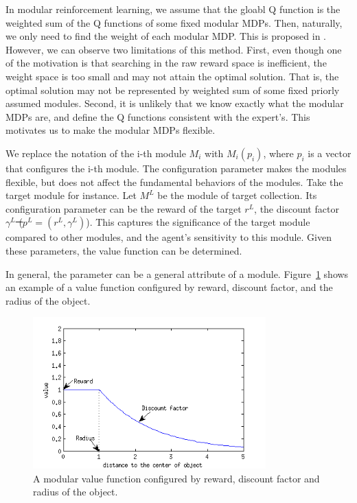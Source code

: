 \documentclass[12pt]{report}	%
\theoremstyle{definition}
\theoremstyle{remark}
\providecommand{\DIFadd}[1]{{\protect\color{blue}\uwave{#1}}} %
\providecommand{\DIFdel}[1]{{\protect\color{red}\sout{#1}}}                      %
\providecommand{\DIFaddbegin}{} %
\providecommand{\DIFaddend}{} %
\providecommand{\DIFdelbegin}{} %
\providecommand{\DIFdelend}{} %
\begin{document}
In modular reinforcement learning, we assume that the gloabl Q function is the
weighted sum of the Q functions of some fixed modular MDPs. Then, naturally, we only
need to find the weight of each modular MDP. This is proposed in \cite{rothkopf2013modular}.
However, we can observe two
limitations of this method. First, even though one of the motivation is that
searching in the raw reward space is inefficient, the weight space is too small and
may not attain the optimal solution. That is, the optimal solution may not be
represented by weighted sum of some fixed priorly assumed modules.
Second, it is unlikely that we know exactly what the modular MDPs are,
and define the Q functions consistent with the expert's. This motivates us
to make the modular MDPs flexible.

We replace the notation of the i-th module $M_i$ with $M_i(p_i)$, where $p_i$ is
a vector that configures the i-th module. The configuration parameter makes the
modules flexible, but does not affect the fundamental behaviors of the modules.
Take the target module for instance. Let \DIFdelbegin \DIFdel{$M^L$ }\DIFdelend \DIFaddbegin \DIFadd{$M^T$ }\DIFaddend be the module of target
collection. Its configuration parameter can be the reward of the target \DIFdelbegin \DIFdel{$r^L$}\DIFdelend \DIFaddbegin \DIFadd{$r^T$}\DIFaddend , the
discount factor \DIFdelbegin \DIFdel{$\gamma^L$ ($p^L = (r^L, \gamma^L)$}\DIFdelend \DIFaddbegin \DIFadd{$\gamma^T$ ($p^T = (r^T, \gamma^T)$}\DIFaddend ). This captures the
significance of the target module compared to other modules, and the agent's
sensitivity to this module. Given these parameters, the value function can be
determined.

In general, the parameter can be a general attribute of a module.
Figure~\ref{fig:modularQ} shows an example of a value function configured by
reward, discount factor, and the radius of the object.

\begin{figure}[h]
\centering
\includegraphics[width=0.8\textwidth]{figs/modularQ}
\caption{A modular value function configured by reward, discount factor and
radius of the object.}
\label{fig:modularQ}
\end{figure}
\end{document}
